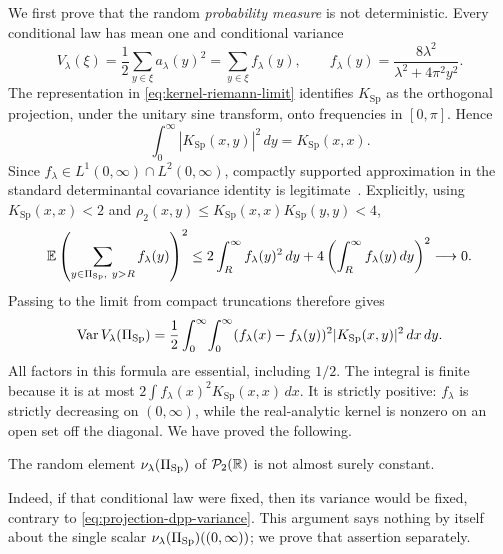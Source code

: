 We first prove that the random \emph{probability measure} is not deterministic.
Every conditional law has mean one and conditional variance
\begin{equation}
 V_\lambda(\xi)=\frac12\sum_{y\in\xi}a_\lambda(y)^2
 =\sum_{y\in\xi} f_\lambda(y),
 \qquad
 f_\lambda(y)=\frac{8\lambda^2}{\lambda^2+4\pi^2y^2}.
 \label{eq:conditional-variance-statistic}
\end{equation}
The representation in \eqref{eq:kernel-riemann-limit} identifies
\(K_{\mathrm{Sp}}\) as the orthogonal projection, under the unitary sine
transform, onto frequencies in \([0,\pi]\).  Hence
\begin{equation}
 \int_0^\infty|K_{\mathrm{Sp}}(x,y)|^2\,dy
 =K_{\mathrm{Sp}}(x,x).
 \label{eq:projection-kernel-identity}
\end{equation}
Since \(f_\lambda\in L^1(0,\infty)\cap L^2(0,\infty)\), compactly
supported approximation in the standard determinantal covariance identity
is legitimate~\cite[Definition~3 and (1.20)]{Soshnikov2000}.  Explicitly,
using \(K_{\mathrm{Sp}}(x,x)<2\) and
\(\rho_2(x,y)\le K_{\mathrm{Sp}}(x,x)K_{\mathrm{Sp}}(y,y)<4\),
\[
 \E\left(\sum_{y\in\PiSp,\ y>R}f_\lambda(y)\right)^2
 \le 2\int_R^\infty f_\lambda(y)^2\,dy
    +4\left(\int_R^\infty f_\lambda(y)\,dy\right)^2
 \longrightarrow0.
\]
Passing to the limit from compact truncations therefore gives
\begin{equation}
 \operatorname{Var} V_\lambda(\Pi_{\mathrm{Sp}})
 =\frac12\int_0^\infty\!\int_0^\infty
   (f_\lambda(x)-f_\lambda(y))^2
   |K_{\mathrm{Sp}}(x,y)|^2\,dx\,dy.
 \label{eq:projection-dpp-variance}
\end{equation}
All factors in this formula are essential, including \(1/2\).  The integral
is finite because it is at most
\(2\int f_\lambda(x)^2K_{\mathrm{Sp}}(x,x)\,dx\).  It is strictly
positive: \(f_\lambda\) is strictly decreasing on \((0,\infty)\), while
the real-analytic kernel is nonzero on an open set off the diagonal.  We have
proved the following.

\begin{proposition}
\label{prop:random-law-nondegenerate}
The random element \(\nu_\lambda(\Pi_{\mathrm{Sp}})\) of \(\mathcal P_2(\mathbb R)\) is not almost surely
constant.
\end{proposition}

Indeed, if that conditional law were fixed, then its variance would be
fixed, contrary to \eqref{eq:projection-dpp-variance}.  This argument says
nothing by itself about the single scalar
\(\nu_\lambda(\Pi_{\mathrm{Sp}})((0,\infty))\); we prove that assertion separately.

